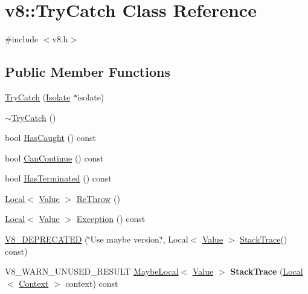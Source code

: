 \hypertarget{classv8_1_1TryCatch}{}\section{v8\+:\+:Try\+Catch Class Reference}
\label{classv8_1_1TryCatch}


{\ttfamily \#include $<$v8.\+h$>$}

\subsection*{Public Member Functions}
\begin{DoxyCompactItemize}
\item 
\mbox{\hyperlink{classv8_1_1TryCatch_a623ce624491b383fae60c05d2aeefb1a}{Try\+Catch}} (\mbox{\hyperlink{classv8_1_1Isolate}{Isolate}} $\ast$isolate)
\item 
\mbox{\hyperlink{classv8_1_1TryCatch_a2c9ad4b40d17dd31c6dd020736b30679}{$\sim$\+Try\+Catch}} ()
\item 
bool \mbox{\hyperlink{classv8_1_1TryCatch_ab77b36a4adf5681da59abfe43adc4e4e}{Has\+Caught}} () const
\item 
bool \mbox{\hyperlink{classv8_1_1TryCatch_ae94d0f0d695dbfecbfcdeb48716b367f}{Can\+Continue}} () const
\item 
bool \mbox{\hyperlink{classv8_1_1TryCatch_a3175391e782afc092495616b4d35b91b}{Has\+Terminated}} () const
\item 
\mbox{\hyperlink{classv8_1_1Local}{Local}}$<$ \mbox{\hyperlink{classv8_1_1Value}{Value}} $>$ \mbox{\hyperlink{classv8_1_1TryCatch_ab8c3a1dbb38e6fd00e37436034daf707}{Re\+Throw}} ()
\item 
\mbox{\hyperlink{classv8_1_1Local}{Local}}$<$ \mbox{\hyperlink{classv8_1_1Value}{Value}} $>$ \mbox{\hyperlink{classv8_1_1TryCatch_acad32566761cace7762e023c9e443323}{Exception}} () const
\item 
\mbox{\hyperlink{classv8_1_1TryCatch_a68d99863957fee038877a2d710cd0958}{V8\+\_\+\+D\+E\+P\+R\+E\+C\+A\+T\+ED}} (\char`\"{}Use maybe version.\char`\"{}, Local$<$ \mbox{\hyperlink{classv8_1_1Value}{Value}} $>$ \mbox{\hyperlink{classv8_1_1StackTrace}{Stack\+Trace}}() const)
\item 
\mbox{\label{classv8_1_1TryCatch_ac8aabb4b19ac590fd6e6aa892bed9af4}} 
V8\+\_\+\+W\+A\+R\+N\+\_\+\+U\+N\+U\+S\+E\+D\+\_\+\+R\+E\+S\+U\+LT \mbox{\hyperlink{classv8_1_1MaybeLocal}{Maybe\+Local}}$<$ \mbox{\hyperlink{classv8_1_1Value}{Value}} $>$ {\bfseries Stack\+Trace} (\mbox{\hyperlink{classv8_1_1Local}{Local}}$<$ \mbox{\hyperlink{classv8_1_1Context}{Context}} $>$ context) const

\end{DoxyCompactItemize}
